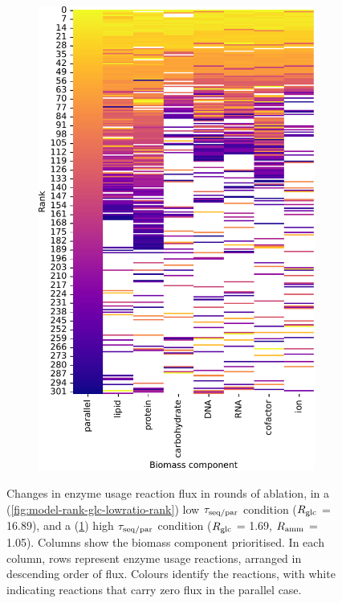 \begin{figure}
\begin{subfigure}[t]{0.45\textwidth}
    \includegraphics[width=\linewidth]{CompareEnzUse_glc01p69_pyrUnres_amm01p05_1.pdf}
    \caption{
    }
    \label{fig:model-rank-glc-highratio-rank}
  \end{subfigure}

  \caption{
    Changes in enzyme usage reaction flux in rounds of ablation, in a (\ref{fig:model-rank-glc-lowratio-rank}) low $\tau_{\mathrm{seq}/\mathrm{par}}$ condition ($R_{\mathrm{glc}}$ = \SI{16.89}{\mmolgdwh}), and a (\ref{fig:model-rank-glc-highratio-rank}) high $\tau_{\mathrm{seq}/\mathrm{par}}$ condition ($R_{\mathrm{glc}}$ = \SI{1.69}{\mmolgdwh}, $R_{\mathrm{amm}}$ = \SI{1.05}{\mmolgdwh}).
    Columns show the biomass component prioritised.
    In each column, rows represent enzyme usage reactions, arranged in descending order of flux.
    Colours identify the reactions, with white indicating reactions that carry zero flux in the parallel case.
  }
  \label{fig:model-rank-glc-rank}
\end{figure}

